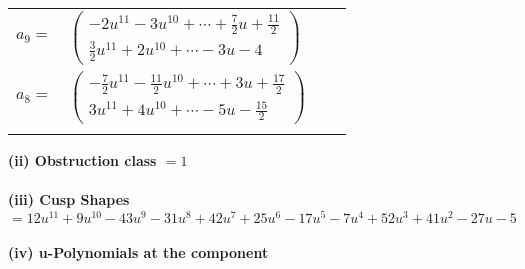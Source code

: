 \documentclass[1p]{elsarticle_modified}
\theoremstyle{definition}
\begin{document}
\begin{tabular}{m{7pt} m{180pt} m{7pt} m{180pt} }
\flushright $a_{9}=$&$\begin{pmatrix}-2 u^{11}-3 u^{10}+\cdots+\frac{7}{2} u+\frac{11}{2}\\\frac{3}{2} u^{11}+2 u^{10}+\cdots-3 u-4\end{pmatrix}$ \\
\flushright $a_{8}=$&$\begin{pmatrix}-\frac{7}{2} u^{11}-\frac{11}{2} u^{10}+\cdots+3 u+\frac{17}{2}\\3 u^{11}+4 u^{10}+\cdots-5 u-\frac{15}{2}\end{pmatrix}$\\&\end{tabular}
\flushleft \textbf{(ii) Obstruction class $= 1$}\\~\\
\flushleft \textbf{(iii) Cusp Shapes $= 12 u^{11}+9 u^{10}-43 u^9-31 u^8+42 u^7+25 u^6-17 u^5-7 u^4+52 u^3+41 u^2-27 u-5$}\\~\\
\newpage\renewcommand{\arraystretch}{1}
\flushleft \textbf{(iv) u-Polynomials at the component}\newline \\
\end{document}
